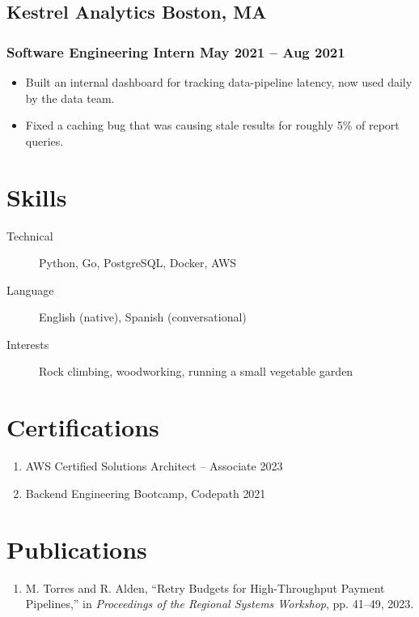 \documentclass[11pt]{article}
\newcommand{\rside}[1]{
  \hfill {\normalfont\color{accent} #1}%
}
\begin{document}
\subsection{Kestrel Analytics \rside{Boston, MA}}
\subsubsection{Software Engineering Intern \rside{May 2021 -- Aug 2021}}
\begin{itemize}
  \item Built an internal dashboard for tracking data-pipeline latency, now used daily by the data team.
  \item Fixed a caching bug that was causing stale results for roughly 5\% of report queries.
\end{itemize}


\section{Skills}
\begin{description}
  \item[Technical] Python, Go, PostgreSQL, Docker, AWS
  \item[Language] English (native), Spanish (conversational)
  \item[Interests] Rock climbing, woodworking, running a small vegetable garden
\end{description}


\section{Certifications}
\begin{enumerate}[label=\null, left=0pt..0pt, itemsep=0pt]
  \item AWS Certified Solutions Architect -- Associate \rside{2023}
  \item Backend Engineering Bootcamp, Codepath \rside{2021}
\end{enumerate}


\section{Publications}
\begin{enumerate}
  \item M. Torres and R. Alden, ``Retry Budgets for High-Throughput Payment Pipelines,'' in \textit{Proceedings of the Regional Systems Workshop}, pp. 41--49, 2023.
\end{enumerate}
\end{document}
